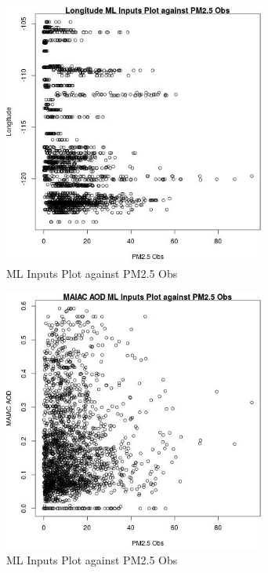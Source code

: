 \begin{figure} 
\centering  
\includegraphics[width=0.77\textwidth]{Code_Outputs/Report_ML_input_PM25_Step4_part_e_de_duplicated_aves_LongitudevPM25_Obs.jpg} 
\caption{\label{fig:Report_ML_input_PM25_Step4_part_e_de_duplicated_avesLongitudevPM25_Obs}ML Inputs Plot against PM2.5 Obs} 
\end{figure} 
 

\begin{figure} 
\centering  
\includegraphics[width=0.77\textwidth]{Code_Outputs/Report_ML_input_PM25_Step4_part_e_de_duplicated_aves_MAIAC_AODvPM25_Obs.jpg} 
\caption{\label{fig:Report_ML_input_PM25_Step4_part_e_de_duplicated_avesMAIAC_AODvPM25_Obs}ML Inputs Plot against PM2.5 Obs} 
\end{figure} 
 


